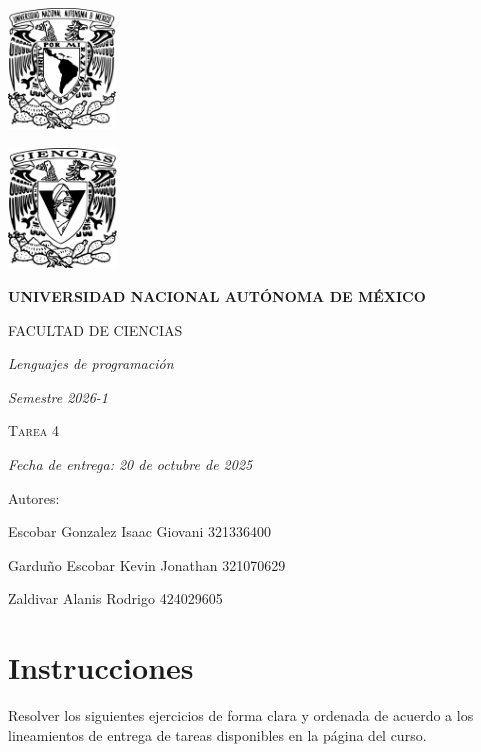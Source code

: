 \documentclass[11pt]{article}
\begin{document}
\begin{titlepage}
    \centering
    \vspace{2cm}
    {\includegraphics[height=3.2cm]{../logo_unam.png}}
    \hfill
    {\includegraphics[height=3.2cm]{../logo_fc.png}\par}
    \vspace{1cm}
    {\bfseries\LARGE UNIVERSIDAD NACIONAL AUTÓNOMA DE MÉXICO \par}
    \vspace{0.7cm}
    {\scshape\Large FACULTAD DE CIENCIAS \par}
    \vspace{1cm}
    {\itshape\Large Lenguajes de programación \par}
    \vspace{0.5cm}
    {\itshape\Large Semestre 2026-1 \par}
    \vspace{2cm}
    {\scshape\Huge Tarea 4 \par}
    \vspace{1cm}
    {\itshape\Large Fecha de entrega: 20 de octubre de 2025 \par}
    \vspace{2cm}
    {\Large Autores: \par}
    \vspace{0.4cm}
    {\Large Escobar Gonzalez Isaac Giovani \hspace{1cm} 321336400 \par}
    {\Large Garduño Escobar Kevin Jonathan \hspace{0.5cm} 321070629 \par}
    {\Large Zaldivar Alanis Rodrigo \hspace{2.75cm} 424029605 \par}
\end{titlepage}
\section*{Instrucciones}
\noindent Resolver los siguientes ejercicios de forma clara y ordenada de acuerdo a los lineamientos de entrega de tareas disponibles en la página del curso.\\
\end{document}
